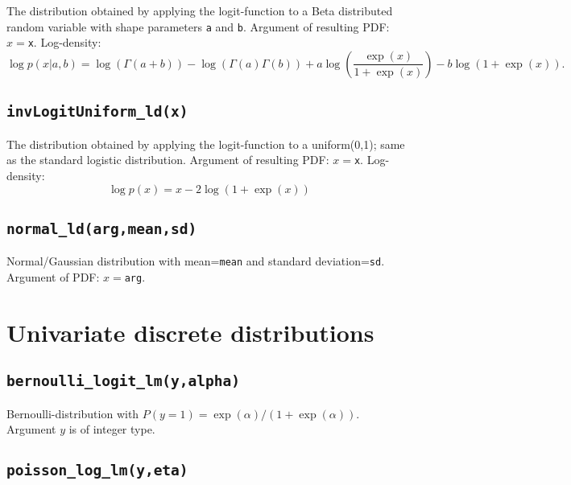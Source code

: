 \documentclass[
]{book}
\begin{document}
The distribution obtained by applying the logit-function to a Beta distributed random variable with shape parameters \texttt{a} and \texttt{b}. Argument of resulting PDF: \(x=\)\texttt{x}. Log-density:
\[
\log p(x|a,b) = \log(\Gamma(a+b)) - \log(\Gamma(a)\Gamma(b)) + a\log\left(\frac{\exp(x)}{1+\exp(x)}\right) - b\log(1+\exp(x)).
\]

\hypertarget{invlogituniform_ldx}{%
\subsection{\texorpdfstring{\texttt{invLogitUniform\_ld(x)}}{invLogitUniform\_ld(x)}}\label{invlogituniform_ldx}}

The distribution obtained by applying the logit-function to a uniform(0,1); same as the standard logistic distribution. Argument of resulting PDF: \(x=\)\texttt{x}. Log-density:
\[
\log p(x) = x - 2\log(1+\exp(x))
\]

\hypertarget{normal_ldargmeansd}{%
\subsection{\texorpdfstring{\texttt{normal\_ld(arg,mean,sd)}}{normal\_ld(arg,mean,sd)}}\label{normal_ldargmeansd}}

Normal/Gaussian distribution with mean=\texttt{mean} and standard deviation=\texttt{sd}. Argument of PDF: \(x=\)\texttt{arg}.

\hypertarget{univariate-discrete-distributions}{%
\section{Univariate discrete distributions}\label{univariate-discrete-distributions}}

\hypertarget{bernoulli_logit_lmyalpha}{%
\subsection{\texorpdfstring{\texttt{bernoulli\_logit\_lm(y,alpha)}}{bernoulli\_logit\_lm(y,alpha)}}\label{bernoulli_logit_lmyalpha}}

Bernoulli-distribution with \(P(y=1)=\exp(\alpha)/(1+\exp(\alpha))\). Argument \(y\) is of integer type.

\hypertarget{poisson_log_lmyeta}{%
\subsection{\texorpdfstring{\texttt{poisson\_log\_lm(y,eta)}}{poisson\_log\_lm(y,eta)}}\label{poisson_log_lmyeta}}
\end{document}
